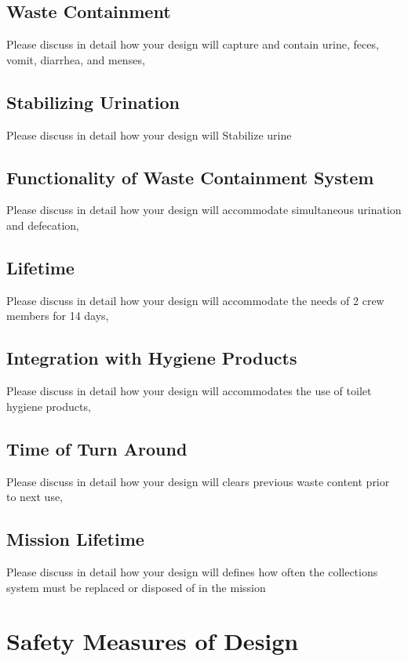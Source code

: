     \subsection{Waste Containment}
    Please discuss in detail how your design will capture and contain urine, feces, vomit, diarrhea, and menses,

    \subsection{Stabilizing Urination}
    Please discuss in detail how your design will Stabilize urine
    
    \subsection{Functionality of Waste Containment System}
    Please discuss in detail how your design will accommodate simultaneous urination and defecation,

    \subsection{Lifetime}
    Please discuss in detail how your design will accommodate the needs of 2 crew members for 14 days,

    \subsection{Integration with Hygiene Products}
    Please discuss in detail how your design will accommodates the use of toilet hygiene products,

    \subsection{Time of Turn Around}
    Please discuss in detail how your design will clears previous waste content prior to next use,

    \subsection{Mission Lifetime}
    Please discuss in detail how your design will defines how often the collections system must be replaced or disposed of in the mission

\pagebreak
\section[Safety]{Safety Measures of Design}

